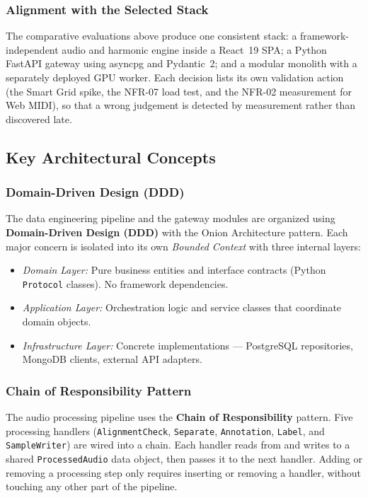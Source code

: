 \documentclass[a4paper]{article}
\begin{document}
\subsubsection{Alignment with the Selected Stack}

The comparative evaluations above produce one consistent stack: a framework-independent audio and harmonic engine inside a React~19 SPA; a Python FastAPI gateway using asyncpg and Pydantic~2; and a modular monolith with a separately deployed GPU worker. Each decision lists its own validation action (the Smart Grid spike, the NFR-07 load test, and the NFR-02 measurement for Web MIDI), so that a wrong judgement is detected by measurement rather than discovered late.

\subsection{Key Architectural Concepts}

\subsubsection{Domain-Driven Design (DDD)}\label{sec:ddd}

The data engineering pipeline and the gateway modules are organized using \textbf{Domain-Driven Design (DDD)} with the Onion Architecture pattern. Each major concern is isolated into its own \textit{Bounded Context} with three internal layers:
\begin{itemize}
    \item \textit{Domain Layer:} Pure business entities and interface contracts (Python \texttt{Protocol} classes). No framework dependencies.
    \item \textit{Application Layer:} Orchestration logic and service classes that coordinate domain objects.
    \item \textit{Infrastructure Layer:} Concrete implementations --- PostgreSQL repositories, MongoDB clients, external API adapters.
\end{itemize}

\subsubsection{Chain of Responsibility Pattern}

The audio processing pipeline uses the \textbf{Chain of Responsibility} pattern. Five processing handlers (\texttt{AlignmentCheck}, \texttt{Separate}, \texttt{Annotation}, \texttt{Label}, and \texttt{SampleWriter}) are wired into a chain. Each handler reads from and writes to a shared \texttt{ProcessedAudio} data object, then passes it to the next handler. Adding or removing a processing step only requires inserting or removing a handler, without touching any other part of the pipeline.
\end{document}
